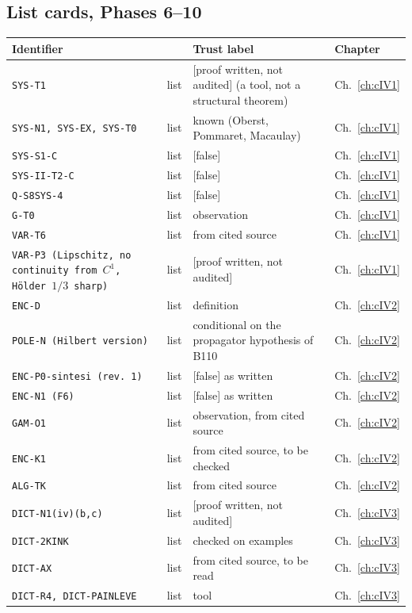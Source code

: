 \documentclass[11pt,a4paper,oneside]{report}
\newcommand{\badge}[2]{\textcolor{#1}{\textsf{\footnotesize[#2]}}}
\newcommand{\pw}{\badge{cD}{proof written, not audited}}
\newcommand{\falsest}{\badge{cB}{false}}
\begin{document}
\subsection*{List cards, Phases 6--10}
\begin{center}\small
\begin{longtable}{@{}L{5.4cm}L{1.0cm}L{5.6cm}L{1.4cm}@{}}
\toprule
Identifier & & Trust label & Chapter\\ \midrule\endhead
\texttt{SYS-T1} & list & \pw{} (a tool, not a structural theorem) & Ch.~\ref{ch:cIV1}\\
\texttt{SYS-N1, SYS-EX, SYS-T0} & list & known (Oberst, Pommaret, Macaulay) & Ch.~\ref{ch:cIV1}\\
\texttt{SYS-S1-C} & list & \falsest & Ch.~\ref{ch:cIV1}\\
\texttt{SYS-II-T2-C} & list & \falsest & Ch.~\ref{ch:cIV1}\\
\texttt{Q-S8SYS-4} & list & \falsest & Ch.~\ref{ch:cIV1}\\
\texttt{G-T0} & list & observation & Ch.~\ref{ch:cIV1}\\
\texttt{VAR-T6} & list & from cited source & Ch.~\ref{ch:cIV1}\\
\texttt{VAR-P3 (Lipschitz, no continuity from $C^1$, H\"older $1/3$ sharp)} & list & \pw & Ch.~\ref{ch:cIV1}\\
\texttt{ENC-D} & list & definition & Ch.~\ref{ch:cIV2}\\
\texttt{POLE-N (Hilbert version)} & list & conditional on the propagator hypothesis of B110 & Ch.~\ref{ch:cIV2}\\
\texttt{ENC-P0-sintesi (rev.~1)} & list & \falsest{} as written & Ch.~\ref{ch:cIV2}\\
\texttt{ENC-N1 (F6)} & list & \falsest{} as written & Ch.~\ref{ch:cIV2}\\
\texttt{GAM-O1} & list & observation, from cited source & Ch.~\ref{ch:cIV2}\\
\texttt{ENC-K1} & list & from cited source, to be checked & Ch.~\ref{ch:cIV2}\\
\texttt{ALG-TK} & list & from cited source & Ch.~\ref{ch:cIV2}\\
\texttt{DICT-N1(iv)(b,c)} & list & \pw & Ch.~\ref{ch:cIV3}\\
\texttt{DICT-2KINK} & list & checked on examples & Ch.~\ref{ch:cIV3}\\
\texttt{DICT-AX} & list & from cited source, to be read & Ch.~\ref{ch:cIV3}\\
\texttt{DICT-R4, DICT-PAINLEVE} & list & tool & Ch.~\ref{ch:cIV3}\\

\end{longtable}
\end{center}
\end{document}
